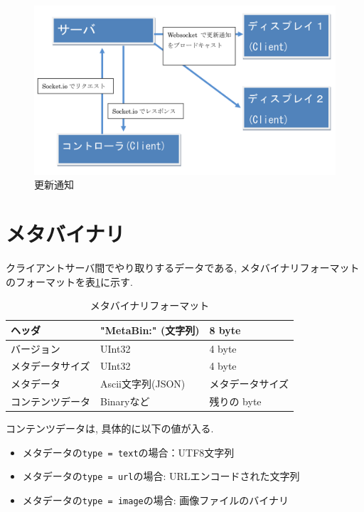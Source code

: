 \documentclass[a4paper,10pt,oneside]{jsbook}
\begin{document}
\begin{figure}[htbp]
	\begin{center}
		\includegraphics[width=14.5cm]{image/connection.png}
	\end{center}
	\caption{更新通知}
	\label{fig:connection}
\end{figure}

\newpage

\section{メタバイナリ}

クライアントサーバ間でやり取りするデータである, メタバイナリフォーマットのフォーマットを表\ref{metabin}に示す.


\begin{table}[htbp]
\begin{center}
\caption{メタバイナリフォーマット}
\label{metabin}
\begin{tabular}{|l|l|l|}
\hline
ヘッダ & "MetaBin:" (文字列) & 8 byte   \\
\hline
バージョン & UInt32 & 4 byte \\
\hline
メタデータサイズ & UInt32 & 4 byte \\
\hline
メタデータ & Ascii文字列(JSON) & メタデータサイズ \\
\hline
コンテンツデータ & Binaryなど & 残りの byte \\
\hline

\end{tabular}
\end{center}
\end{table}

コンテンツデータは, 具体的に以下の値が入る.
\begin{itemize}
\item メタデータの\verb+type = text+の場合：UTF8文字列
\item メタデータの\verb+type = url+の場合: URLエンコードされた文字列
\item メタデータの\verb+type = image+の場合: 画像ファイルのバイナリ
\end{itemize}
\end{document}
